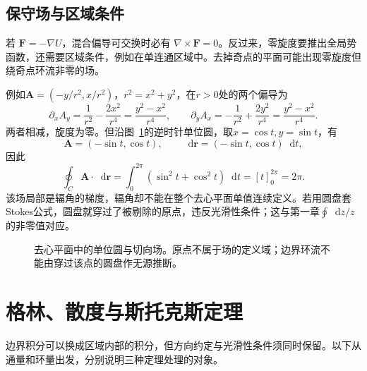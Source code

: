 \documentclass[11pt,openany,fontset=fandol]{ctexbook}
\theoremstyle{plain}\newtheorem{theorem}{定理}[chapter]\newtheorem{proposition}[theorem]{命题}
\theoremstyle{definition}\newtheorem{definition}{定义}[chapter]\newtheorem{example}{例}[chapter]
\theoremstyle{remark}\newtheorem*{remark}{说明}
\newcommand{\dd}{\mathop{}\!\mathrm d}\newcommand{\ii}{\mathrm i}\newcommand{\ee}{\mathrm e}
\newcommand{\vct}[1]{\bm{#1}}\newcommand{\Rea}{\operatorname{Re}}\newcommand{\Ima}{\operatorname{Im}}
\begin{document}
\subsection{保守场与区域条件}
若 $\vct F=-\nabla U$，混合偏导可交换时必有 $\nabla\times\vct F=0$。反过来，零旋度要推出全局势函数，还需要区域条件，例如在单连通区域中。去掉奇点的平面可能出现零旋度但绕奇点环流非零的场。

例如$\vct A=(-y/r^2,x/r^2)$，$r^2=x^2+y^2$，在$r>0$处的两个偏导为
\[\partial_xA_y=\frac1{r^2}-\frac{2x^2}{r^4}
=\frac{y^2-x^2}{r^4},\qquad
\partial_yA_x=-\frac1{r^2}+\frac{2y^2}{r^4}
=\frac{y^2-x^2}{r^4}.\]
两者相减，旋度为零。但沿图~\ref{fig:math-vortex-puncture}的逆时针单位圆，取$x=\cos t,y=\sin t$，有
\[\vct A=(-\sin t,\cos t),\qquad
\dd\vct r=(-\sin t,\cos t)\dd t,\]
因此
\[\oint_C\vct A\cdot\dd\vct r
=\int_0^{2\pi}(\sin^2t+\cos^2t)\dd t=[t]_0^{2\pi}=2\pi.\]
该场局部是辐角的梯度，辐角却不能在整个去心平面单值连续定义。若用圆盘套Stokes公式，圆盘就穿过了被剔除的原点，违反光滑性条件；这与第一章$\oint\dd z/z$的非零值对应。
\begin{figure}[htbp]\centering
{}
\caption{去心平面中的单位圆与切向场。原点不属于场的定义域；边界环流不能由穿过该点的圆盘作无源推断。}
\label{fig:math-vortex-puncture}
\end{figure}

\section{格林、散度与斯托克斯定理}
边界积分可以换成区域内部的积分，但方向约定与光滑性条件须同时保留。以下从通量和环量出发，分别说明三种定理处理的对象。
\end{document}
